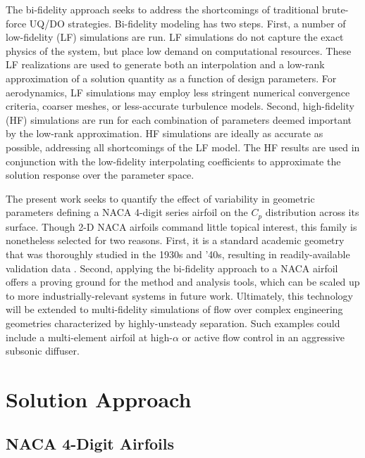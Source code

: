 \documentclass[11pt]{article}
\begin{document}
The bi-fidelity approach seeks to address the shortcomings of traditional brute-force UQ/DO strategies. Bi-fidelity modeling has two steps. First, a number of low-fidelity (LF) simulations are run. LF simulations do not capture the exact physics of the system, but place low demand on computational resources. These LF realizations are used to generate both an interpolation and a low-rank approximation of a solution quantity as a function of design parameters. For aerodynamics, LF simulations may employ less stringent numerical convergence criteria, coarser meshes, or less-accurate turbulence models. Second, high-fidelity (HF) simulations are run for each combination of parameters deemed important by the low-rank approximation. HF simulations are ideally as accurate as possible, addressing all shortcomings of the LF model. The HF results are used in conjunction with the low-fidelity interpolating coefficients to approximate the solution response over the parameter space.

The present work seeks to quantify the effect of variability in geometric parameters defining a NACA 4-digit series airfoil on the $C_p$ distribution across its surface. Though 2-D NACA airfoils command little topical interest, this family is nonetheless selected for two reasons. First, it is a standard academic geometry that was thoroughly studied in the 1930s and '40s, resulting in readily-available validation data \cite{NACA824}. Second, applying the bi-fidelity approach to a NACA airfoil offers a proving ground for the method and analysis tools, which can be scaled up to more industrially-relevant systems in future work. Ultimately, this technology will be extended to multi-fidelity simulations of flow over complex engineering geometries characterized by highly-unsteady separation. Such examples could include a multi-element airfoil at high-$\alpha$ or active flow control in an aggressive subsonic diffuser.

\section{Solution Approach}

\subsection{NACA 4-Digit Airfoils}
\end{document}
